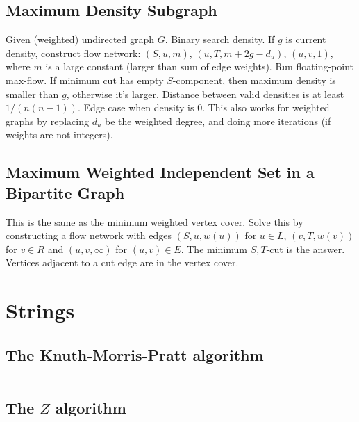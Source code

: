 \documentclass[9pt,a4paper,twocolumn,landscape,oneside]{amsart}
\newcommand{\code}[1]{\inputminted{cpp}{_code/#1}}
\newif\ifverbose
\begin{document}
    \subsection{Maximum Density Subgraph}
        Given (weighted) undirected graph $G$. Binary search density. If $g$ is
        current density, construct flow network: $(S, u, m)$, $(u, T,
        m+2g-d_u)$, $(u,v,1)$, where $m$ is a large constant (larger than sum
        of edge weights). Run floating-point max-flow. If minimum cut has empty
        $S$-component, then maximum density is smaller than $g$, otherwise it's
        larger. Distance between valid densities is at least $1/(n(n-1))$. Edge
        case when density is $0$. This also works for weighted graphs by
        replacing $d_u$ be the weighted degree, and doing more iterations (if
        weights are not integers).

    \subsection{Maximum Weighted Independent Set in a Bipartite Graph}
        This is the same as the minimum weighted vertex cover. Solve this by
        constructing a flow network with edges $(S,u,w(u))$ for $u\in L$,
        $(v,T,w(v))$ for $v\in R$ and $(u,v,\infty)$ for $(u,v)\in E$. The
        minimum $S,T$-cut is the answer. Vertices adjacent to a cut edge are
        in the vertex cover.

\section{Strings}

    \subsection{The Knuth-Morris-Pratt algorithm}
        \ifverbose
        An implementation of the Knuth-Morris-Pratt algorithm. Runs in $O(n+m)$
        time, where $n$ and $m$ are the lengths of the string and the pattern.
        \fi
        \code{strings/kmp.cpp}

    \subsection{The $Z$ algorithm}
        \ifverbose
        Given a string $S$, $Z_i(S)$ is the longest substring of $S$ starting
        at $i$ that is also a prefix of $S$. The $Z$ algorithm computes these
        $Z$ values in $O(n)$ time, where $n = |S|$. $Z$ values can, for
        example, be used to find all occurrences of a pattern $P$ in a string
        $T$ in linear time. This is accomplished by computing $Z$ values of $S
        = T P$, and looking for all $i$ such that $Z_i \geq |T|$.
        \fi
        \code{strings/z_algorithm.cpp}
\end{document}
